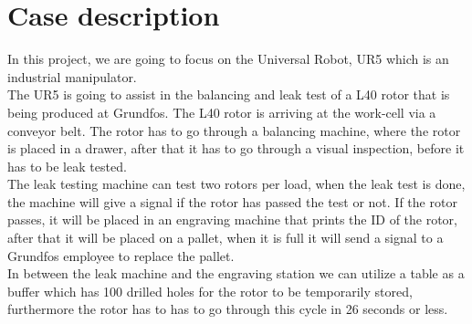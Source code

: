 \section{Case description} \label{ch:case description}

In this project, we are going to focus on the Universal Robot, UR5 which is an industrial manipulator.\\
The UR5 is going to assist in the balancing and leak test of a L40 rotor that is being produced at Grundfos. The L40 rotor is arriving at the work-cell via a conveyor belt. The rotor has to go through a balancing machine, where the rotor is placed in a drawer, after that it has to go through a visual inspection, before it has to be leak tested.\\
The leak testing machine can test two rotors per load, when the leak test is done, the machine will give a signal if the rotor has passed the test or not. If the rotor passes, it will be placed in an engraving machine that prints the ID of the rotor, after that it will be placed on a pallet, when it is full it will send a signal to a Grundfos employee to replace the pallet.\\ 
In between the leak machine and the engraving station we can utilize a table as a buffer which has 100 drilled holes for the rotor to be temporarily stored, furthermore the rotor has to has to go through this cycle in 26 seconds or less.\\